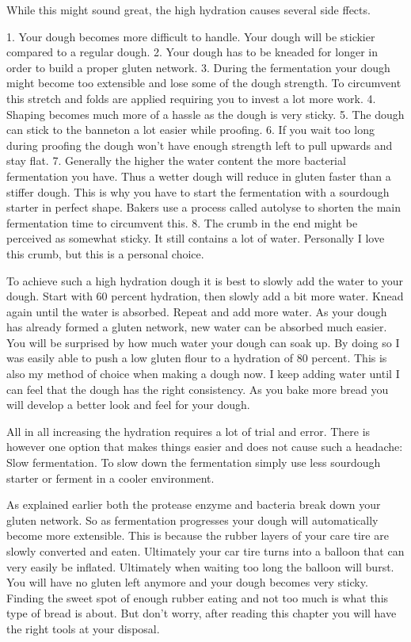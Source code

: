 While this might sound great, the high hydration causes several side ffects.

1. Your dough becomes more difficult to handle. Your dough will be stickier
compared to a regular dough.
2. Your dough has to be kneaded for longer in order to build a proper gluten
network.
3. During the fermentation your dough might become too extensible and lose
some of the dough strength. To circumvent this stretch and folds are applied
requiring you to invest a lot more work.
4. Shaping becomes much more of a hassle as the dough is very sticky.
5. The dough can stick to the banneton a lot easier while proofing.
6. If you wait too long during proofing the dough won't have enough strength
left to pull upwards and stay flat.
7. Generally the higher the water content the more bacterial fermentation you
have. Thus a wetter dough will reduce in gluten faster than a stiffer dough.
This is why you have to start the fermentation with a sourdough starter in
perfect shape. Bakers use a process called autolyse to shorten the main
fermentation time to circumvent this.
8. The crumb in the end might be perceived as somewhat sticky. It still
contains a lot of water. Personally I love this crumb, but this is a personal
choice.

To achieve such a high hydration dough it is best to slowly add the water to
your dough. Start with 60 percent hydration, then slowly add a bit more water. Knead
again until the water is absorbed. Repeat and add more water. As your dough
has already formed a gluten network, new water can be absorbed much easier.
You will be surprised by how much water your dough can soak up. By doing so I
was easily able to push a low gluten flour to a hydration of 80 percent. This
is also my method of choice when making a dough now. I keep adding water until
I can feel that the dough has the right consistency. As you bake more bread
you will develop a better look and feel for your dough.

All in all increasing the hydration requires a lot of trial and error. There
is however one option that makes things easier and does not cause such a
headache: Slow fermentation. To slow down the fermentation simply use less
sourdough starter or ferment in a cooler environment.

As explained earlier both the protease enzyme and bacteria break down your
gluten network. So as fermentation progresses your dough will automatically
become more extensible. This is because the rubber layers of your care tire
are slowly converted and eaten. Ultimately your car tire turns into a balloon
that can very easily be inflated.  Ultimately when waiting too long the
balloon will burst. You will have no gluten left anymore and your dough
becomes very sticky. Finding the sweet spot of enough rubber eating and not
too much is what this type of bread is about. But don't worry, after reading
this chapter you will have the right tools at your disposal.

